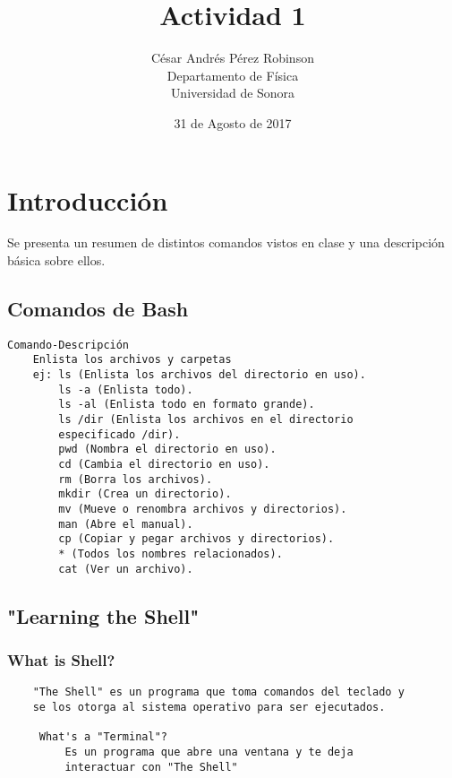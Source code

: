 \documentclass{article}
\title{Actividad 1}
\author{César Andrés Pérez Robinson \\
Departamento de Física \\
Universidad de Sonora}
\date{ 31 de Agosto de 2017}
\begin{document}
\maketitle
\section{Introducción}
Se presenta un resumen de distintos comandos vistos en clase y
una descripción básica sobre ellos.

\subsection{Comandos de Bash}
\begin{verbatim}
Comando-Descripción
	Enlista los archivos y carpetas
	ej: ls (Enlista los archivos del directorio en uso).
	    ls -a (Enlista todo).
	    ls -al (Enlista todo en formato grande).
	    ls /dir (Enlista los archivos en el directorio 
        especificado /dir).
	    pwd (Nombra el directorio en uso).
	    cd (Cambia el directorio en uso).
	    rm (Borra los archivos).
	    mkdir (Crea un directorio).
	    mv (Mueve o renombra archivos y directorios).
	    man (Abre el manual).
	    cp (Copiar y pegar archivos y directorios).
	    * (Todos los nombres relacionados).
	    cat (Ver un archivo).
\end{verbatim}
\subsection{"Learning the Shell"}
\subsubsection{What is Shell?}
\begin{verbatim}
   	"The Shell" es un programa que toma comandos del teclado y 
    se los otorga al sistema operativo para ser ejecutados.

	 What's a "Terminal"?
	     Es un programa que abre una ventana y te deja 
         interactuar con "The Shell"
\end{verbatim}
\end{document}
